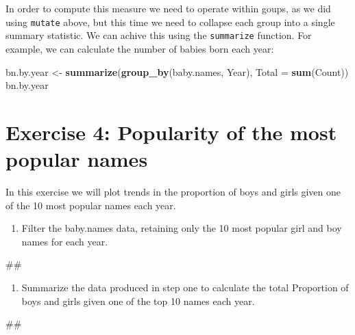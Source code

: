 \documentclass[]{book}
\newenvironment{Shaded}{\begin{snugshade}}{\end{snugshade}}
\newcommand{\KeywordTok}[1]{\textcolor[rgb]{0.13,0.29,0.53}{\textbf{#1}}}
\newcommand{\DataTypeTok}[1]{\textcolor[rgb]{0.13,0.29,0.53}{#1}}
\newcommand{\StringTok}[1]{\textcolor[rgb]{0.31,0.60,0.02}{#1}}
\newcommand{\NormalTok}[1]{#1}
\providecommand{\tightlist}{%
  \setlength{\itemsep}{0pt}\setlength{\parskip}{0pt}}
\begin{document}
In order to compute this measure we need to operate within goups, as we
did using \texttt{mutate} above, but this time we need to collapse each
group into a single summary statistic. We can achive this using the
\texttt{summarize} function. For example, we can calculate the number of
babies born each year:

\begin{Shaded}
\begin{Highlighting}[]
\NormalTok{bn.by.year <-}\StringTok{ }\KeywordTok{summarize}\NormalTok{(}\KeywordTok{group_by}\NormalTok{(baby.names, Year),}
                       \DataTypeTok{Total =} \KeywordTok{sum}\NormalTok{(Count))}
\NormalTok{bn.by.year}
\end{Highlighting}
\end{Shaded}

\section{Exercise 4: Popularity of the most popular
names}\label{exercise-4-popularity-of-the-most-popular-names}

In this exercise we will plot trends in the proportion of boys and girls
given one of the 10 most popular names each year.

\begin{enumerate}
\def\labelenumi{\arabic{enumi}.}
\tightlist
\item
  Filter the baby.names data, retaining only the 10 most popular girl
  and boy names for each year.
\end{enumerate}

\begin{Shaded}
\begin{Highlighting}[]
\NormalTok{##}
\end{Highlighting}
\end{Shaded}

\begin{enumerate}
\def\labelenumi{\arabic{enumi}.}
\setcounter{enumi}{1}
\tightlist
\item
  Summarize the data produced in step one to calculate the total
  Proportion of boys and girls given one of the top 10 names each year.
\end{enumerate}

\begin{Shaded}
\begin{Highlighting}[]
\NormalTok{##}
\end{Highlighting}
\end{Shaded}
\end{document}
